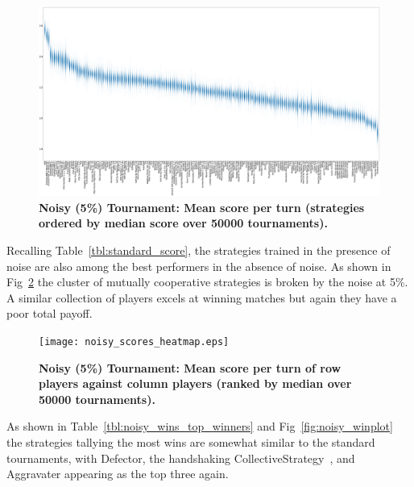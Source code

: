 \documentclass[10pt,letterpaper]{article}
\begin{document}
\begin{landscape}
    \begin{figure}[!hbtp]
        \centering
        \includegraphics[width=\paperwidth]{noisy_scores_boxplots.eps}
        \caption{\bf Noisy (5\%) Tournament: Mean score per turn
            (strategies ordered by median score over 50000 tournaments).}
        \label{fig:noisy_score}
    \end{figure}
\end{landscape}

Recalling Table~\ref{tbl:standard_score}, the strategies trained in the presence
of noise are also among the best performers in the absence of noise. As shown in
Fig~\ref{fig:noisy_heatmap} the cluster of mutually cooperative strategies is
broken by the noise at 5\%. A similar collection of players excels at winning
matches but again they have a poor total payoff.

\begin{figure}[!hbtp]
    \centering
    \texttt{[image: noisy\_scores\_heatmap.eps]}
    \caption{\bf Noisy (5\%) Tournament: Mean score per turn of row players against
    column players (ranked by median over
        50000 tournaments).}
    \label{fig:noisy_heatmap}
\end{figure}

As shown in Table~\ref{tbl:noisy_wins_top_winners} and
Fig~\ref{fig:noisy_winplot} the strategies tallying the most wins are
somewhat similar to the standard tournaments, with Defector, the handshaking
CollectiveStrategy~\cite{Li2009}, and Aggravater appearing as the top three again.
\end{document}
